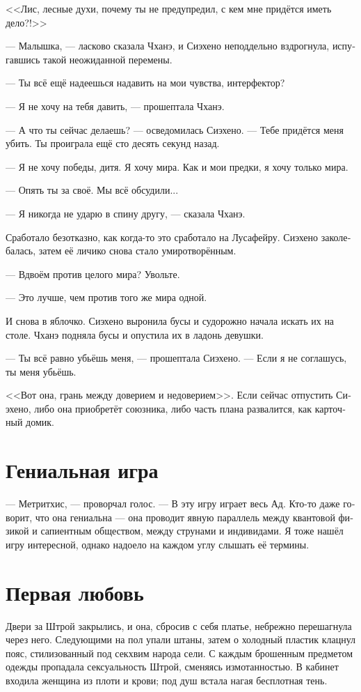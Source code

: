 \documentclass[a4paper,12pt,fleqn]{book}\usepackage{cooltooltips}\usepackage{polyglossia}\setdefaultlanguage[babelshorthands=true]{russian}\setotherlanguage{english}\defaultfontfeatures{Ligatures=TeX,Mapping=tex-text} \usepackage{xcolor}\definecolor{lightgray}{HTML}{bbbbbb}\color{lightgray}\newcommand{\ml}[3]{\textenglish{\textcolor{black}{#3}}}
\begin{document}
{<<Лис, лесные духи, почему ты не предупредил, с кем мне придётся иметь дело?!>>

--- Малышка, --- ласково сказала Чханэ, и Сиэхено неподдельно вздрогнула, испугавшись такой неожиданной перемены.

--- Ты всё ещё надеешься надавить на мои чувства, интерфектор?

--- Я не хочу на тебя давить, --- прошептала Чханэ.

--- А что ты сейчас делаешь? --- осведомилась Сиэхено.
--- Тебе придётся меня убить.
Ты проиграла ещё сто десять секунд назад.

--- Я не хочу победы, дитя.
Я хочу мира.
Как и мои предки, я хочу только мира.

--- Опять ты за своё.
Мы всё обсудили...

--- Я никогда не ударю в спину другу, --- сказала Чханэ.

Сработало безотказно, как когда-то это сработало на Лусафейру.
Сиэхено заколебалась, затем её личико снова стало умиротворённым.

--- Вдвоём против целого мира?
Увольте.

--- Это лучше, чем против того же мира одной.

И снова в яблочко.
Сиэхено выронила бусы и судорожно начала искать их на столе.
Чханэ подняла бусы и опустила их в ладонь девушки.

--- Ты всё равно убьёшь меня, --- прошептала Сиэхено.
--- Если я не соглашусь, ты меня убьёшь.

<<Вот она, грань между доверием и недоверием>>.
Если сейчас отпустить Сиэхено, либо она приобретёт союзника, либо часть плана развалится, как карточный домик.

\section{Гениальная игра}

--- Метритхис, --- проворчал голос.
--- В эту игру играет весь Ад.
Кто-то даже говорит, что она гениальна --- она проводит явную параллель между квантовой физикой и сапиентным обществом, между струнами и индивидами.
Я тоже нашёл игру интересной, однако надоело на каждом углу слышать её термины.

\section{Первая любовь}

Двери за Штрой закрылись, и она, сбросив с себя платье, небрежно перешагнула через него.
Следующими на пол упали штаны, затем о холодный пластик клацнул пояс, стилизованный под секхвим народа сели.
С каждым брошенным предметом одежды пропадала сексуальность Штрой, сменяясь измотанностью.
В кабинет входила женщина из плоти и крови;
под душ встала нагая бесплотная тень.

}
\end{document}
